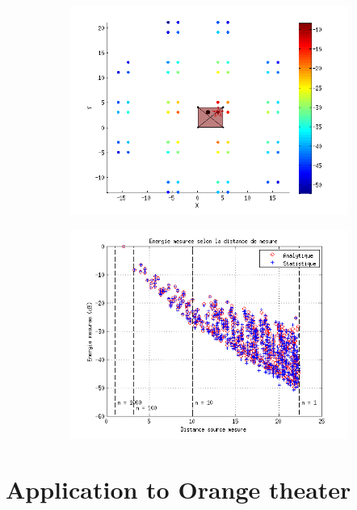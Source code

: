 \documentclass[AMA,STIX1COL]{WileyNJD-v2}
\begin{document}
\begin{figure}[t]
\centering
	\begin{subfigure}{0.49\textwidth}
		\includegraphics[width=\linewidth]{sourcesImages}
		\caption{}
		\label{sourcesImages}
	\end{subfigure}
	\begin{subfigure}{0.49\textwidth}
		\includegraphics[width=\linewidth]{boite}
		\caption{}
		\label{boite}
	\end{subfigure}
	\caption{}
\end{figure}


\section{Application to Orange theater}
\end{document}
